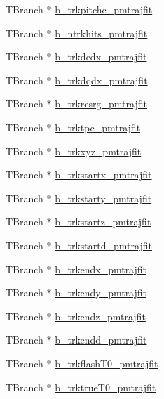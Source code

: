 \begin{DoxyCompactItemize}
\item 
T\-Branch $\ast$ \hyperlink{classanatree_ad2a711b75b0d93066ef892dc06315a15}{b\-\_\-trkpitchc\-\_\-pmtrajfit}
\item 
T\-Branch $\ast$ \hyperlink{classanatree_ac4b4692c50dc61fd691d97d0fd445554}{b\-\_\-ntrkhits\-\_\-pmtrajfit}
\item 
T\-Branch $\ast$ \hyperlink{classanatree_a70824dac2d9890b38a72e0be6ffaea45}{b\-\_\-trkdedx\-\_\-pmtrajfit}
\item 
T\-Branch $\ast$ \hyperlink{classanatree_a9e86826eb750074fd480290fb18e7592}{b\-\_\-trkdqdx\-\_\-pmtrajfit}
\item 
T\-Branch $\ast$ \hyperlink{classanatree_abac9d506c046cfd2e783361e6801edd7}{b\-\_\-trkresrg\-\_\-pmtrajfit}
\item 
T\-Branch $\ast$ \hyperlink{classanatree_acb6ab2fadf89c222b436ba9b0c5c2559}{b\-\_\-trktpc\-\_\-pmtrajfit}
\item 
T\-Branch $\ast$ \hyperlink{classanatree_a91c664c04321bf2d8fb280257e1565ca}{b\-\_\-trkxyz\-\_\-pmtrajfit}
\item 
T\-Branch $\ast$ \hyperlink{classanatree_aced818adb6a35024f9ff8e82c537e5f3}{b\-\_\-trkstartx\-\_\-pmtrajfit}
\item 
T\-Branch $\ast$ \hyperlink{classanatree_a019e3a2758fc01a83e5c1afbb2158c38}{b\-\_\-trkstarty\-\_\-pmtrajfit}
\item 
T\-Branch $\ast$ \hyperlink{classanatree_ad146936adfd1faee31453548cec69838}{b\-\_\-trkstartz\-\_\-pmtrajfit}
\item 
T\-Branch $\ast$ \hyperlink{classanatree_ab10758ef9c044f8b1f377835013f4aa4}{b\-\_\-trkstartd\-\_\-pmtrajfit}
\item 
T\-Branch $\ast$ \hyperlink{classanatree_ae6791bd0133c7875a0792beb2fc5ea65}{b\-\_\-trkendx\-\_\-pmtrajfit}
\item 
T\-Branch $\ast$ \hyperlink{classanatree_ae76fbb3bfac489e9d02d31831377a0fd}{b\-\_\-trkendy\-\_\-pmtrajfit}
\item 
T\-Branch $\ast$ \hyperlink{classanatree_a70c298597cd7028c8d0d617f894fe629}{b\-\_\-trkendz\-\_\-pmtrajfit}
\item 
T\-Branch $\ast$ \hyperlink{classanatree_a55c856debe271a019ac7c6cf2036a42e}{b\-\_\-trkendd\-\_\-pmtrajfit}
\item 
T\-Branch $\ast$ \hyperlink{classanatree_a613adda2d0c0ae583c999a99b5cd87b6}{b\-\_\-trkflash\-T0\-\_\-pmtrajfit}
\item 
T\-Branch $\ast$ \hyperlink{classanatree_ac446afc6deb73abd9dab37ad73f1fa8c}{b\-\_\-trktrue\-T0\-\_\-pmtrajfit}

\end{DoxyCompactItemize}
